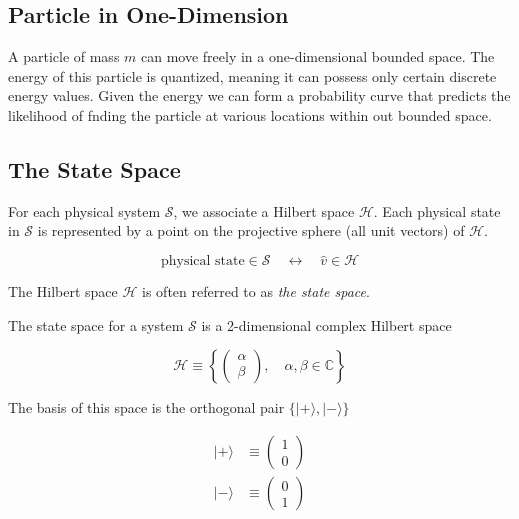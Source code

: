 \documentclass[a4paper]{article}
\begin{document}
\subsection{Particle in One-Dimension}

A particle of mass \(m\) can move freely in a one-dimensional bounded space.
The energy of this particle is quantized, meaning it can possess only certain discrete energy values.
Given the energy we can form a probability curve that predicts the likelihood of fnding the particle at various locations within out bounded space.

\subsection{The State Space}

For each physical system \(\mathscr{S}\), we associate a Hilbert space \(\mathcal{H}\).
Each physical state in \(\mathscr{S}\) is represented by a point on the projective sphere (all unit vectors) of \(\mathcal{H}\).

\[
    \text{physical state} \in \mathscr{S} \quad\longleftrightarrow\quad \hat{v} \in \mathcal{H}
\]

The Hilbert space \(\mathcal{H}\) is often referred to as \textit{the state space}.

The state space for a system \(\mathscr{S}\) is a 2-dimensional complex Hilbert space

\[
    \mathcal{H} \equiv
    \left\{
        \begin{pmatrix}
            \alpha \\
            \beta
        \end{pmatrix}
        ,\quad \alpha ,\beta \in \mathbb{C}
    \right\}
\]

The basis of this space is the orthogonal pair \(\{|+\rangle ,|-\rangle\}\)

\begin{align*}
    |+\rangle &\equiv
    \begin{pmatrix}
        1 \\
        0
    \end{pmatrix} \\
    |-\rangle &\equiv
    \begin{pmatrix}
        0 \\
        1
    \end{pmatrix}
\end{align*}

\end{document}
